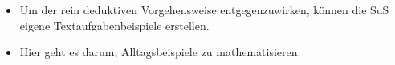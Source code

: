 \documentclass[
  10pt,
  a4paper,
  DIV=11]{scrartcl}
\providecommand{\tightlist}{%
  \setlength{\itemsep}{0pt}\setlength{\parskip}{0pt}}\usepackage{longtable,booktabs,array}
\begin{document}
\begin{itemize}
  \begin{itemize}
  \tightlist
  \item
    Um der rein deduktiven Vorgehensweise entgegenzuwirken, können die
    SuS eigene Textaufgabenbeispiele erstellen.
  \item
    Hier geht es darum, Alltagsbeispiele zu mathematisieren.
  \end{itemize}
\end{itemize}
\end{document}
